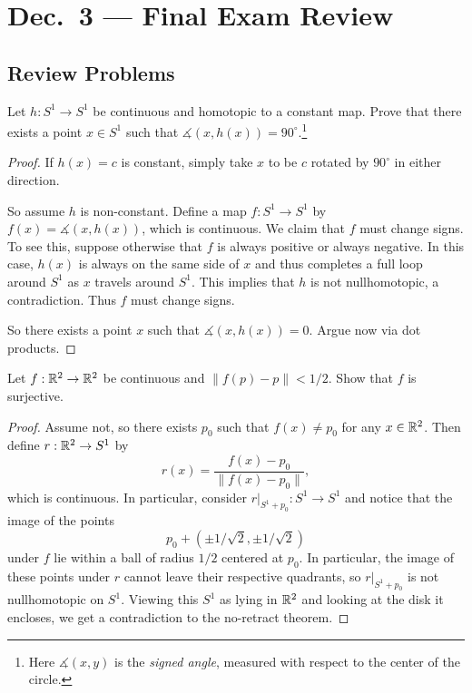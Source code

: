 \chapter{Dec.~3 --- Final Exam Review}

\section{Review Problems}

\begin{exercise}
  Let $h : S^1 \to S^1$ be continuous and homotopic
  to a constant map. Prove that there exists
  a point $x \in S^1$ such that
  $\measuredangle(x, h(x)) = 90^\circ$.\footnote{Here $\measuredangle(x, y)$ is the \emph{signed angle}, measured with respect to the center of the circle.}
\end{exercise}

\begin{proof}
  If $h(x) = c$ is constant, simply take $x$ to be
  $c$ rotated by $90^\circ$ in either direction.

  So assume $h$ is non-constant. Define a
  map $f : S^1 \to S^1$ by
  $f(x) = \measuredangle(x, h(x))$, which is
  continuous. We claim that $f$ must change
  signs. To see this, suppose otherwise that
  $f$ is always positive or always negative. In
  this case, $h(x)$ is always on the same side
  of $x$ and thus completes a full loop around
  $S^1$ as $x$ travels around $S^1$. This
  implies that $h$ is not nullhomotopic, a
  contradiction. Thus $f$ must change signs.

  So there exists a point $x$ such that
  $\measuredangle(x, h(x)) = 0$. Argue now via dot
  products.
\end{proof}

\begin{exercise}
  Let $f : \mathbb{R}^2 \to \mathbb{R}^2$ be continuous and
  $\|f(p) - p\| < 1 / 2$. Show that $f$ is surjective.
\end{exercise}

\begin{proof}
  Assume not, so there exists $p_0$ such that
  $f(x) \ne p_0$ for any $x \in \mathbb{R}^2$. Then define
  $r : \mathbb{R}^2 \to S^1$ by
  \[
    r(x) = \frac{f(x) - p_0}{\|f(x) - p_0\|},
  \]
  which is continuous. In particular,
  consider $r|_{S^1 + p_0} : S^1 \to S^1$ and notice
  that the image of the points
  \[p_0 + (\pm 1 / \sqrt{2}, \pm 1 / \sqrt{2})\]
  under $f$ lie within a ball of radius
  $1 / 2$ centered at $p_0$. In particular, the
  image of these points under $r$ cannot leave
  their respective quadrants, so $r|_{S^1 + p_0}$
  is not nullhomotopic on $S^1$. Viewing this
  $S^1$ as lying in $\mathbb{R}^2$ and looking at
  the disk it encloses, we get a contradiction
  to the no-retract theorem.
\end{proof}

